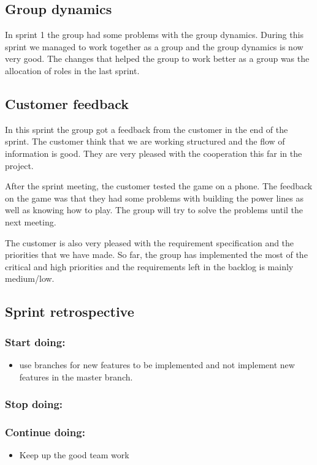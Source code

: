 \subsection{Group dynamics}
	In sprint 1 the group had some problems with the group dynamics. 
	During this sprint we managed to work together as a group and the group dynamics
	is now very good. The changes that helped the group to work better as a group
	was the allocation of roles in the last sprint. 

\subsection{Customer feedback}
	In this sprint the group got a feedback from the customer in the end of the sprint.
	The customer think that we are working structured and the flow of information is good.
	They are very pleased with the cooperation this far in the project.

	After the sprint meeting, the customer tested the game on a phone. The feedback on the game
	was that they had some problems with building the power lines as well as knowing how to play.
	The group will try to solve the problems until the next meeting.

	The customer is also very pleased with the requirement specification and the priorities
	that we have made. So far, the group has implemented the most of the critical and high
	priorities and the requirements left in the backlog is mainly medium/low. 

\subsection{Sprint retrospective}
	\subsubsection*{Start doing: } 
		\begin{itemize}
			\item use branches for new features to be implemented and not implement new 
			features in the master branch.
		\end{itemize}
	\subsubsection*{Stop doing: }

	\subsubsection*{Continue doing: }
		\begin{itemize}
			\item Keep up the good team work
		\end{itemize}

